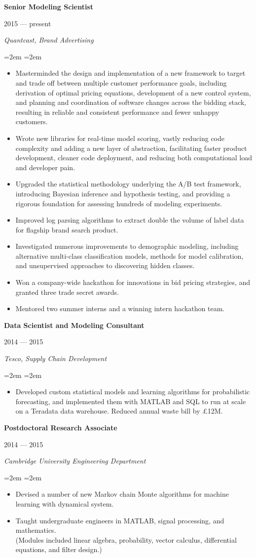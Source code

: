 \documentclass[letterpaper,10pt]{article}
\newcommand{\sepspace}{\vspace*{0.3em}}
\newcommand{\MainHeading}[1]{\noindent\textbf{#1}}
\newcommand{\SubHeading}[1]{\noindent\textit{#1}}
\newcommand{\DateBox}[1]{\colorbox{light-gray}{\parbox{8em}{\hfill\color{White}#1}}}
\newcommand{\Details}[1]{\hangindent=2em\hangafter=0\small#1\normalsize\par}
\newcommand{\WorkEntry}[4]{%
                \MainHeading{#1} \hfill \DateBox{#2} \par
                \SubHeading{#3} \par
                \noindent \hangindent=2em \hangafter=0 \Details{#4} }
\begin{document}
\WorkEntry{Senior Modeling Scientist}{2015 --- present}{Quantcast, Brand Advertising}{
\begin{itemize}
 \item Masterminded the design and implementation of a new framework to target and trade off between multiple customer performance goals, including derivation of optimal pricing equations, development of a new control system, and planning and coordination of software changes across the bidding stack, resulting in reliable and consistent performance and fewer unhappy customers.
 \item Wrote new libraries for real-time model scoring, vastly reducing code complexity and adding a new layer of abstraction, facilitating faster product development, cleaner code deployment, and reducing both computational load and developer pain.
 \item Upgraded the statistical methodology underlying the A/B test framework, introducing Bayesian inference and hypothesis testing, and providing a rigorous foundation for assessing hundreds of modeling experiments.
 \item Improved log parsing algorithms to extract double the volume of label data for flagship brand search product.
 \item Investigated numerous improvements to demographic modeling, including alternative multi-class classification models, methods for model calibration, and unsupervised approaches to discovering hidden classes.
 \item Won a company-wide hackathon for innovations in bid pricing strategies, and granted three trade secret awards.
 \item Mentored two summer interns and a winning intern hackathon team.%
\end{itemize}
}
\sepspace

\WorkEntry{Data Scientist and Modeling Consultant}{2014 --- 2015}{Tesco, Supply Chain Development}{
\begin{itemize}
 \item Developed custom statistical models and learning algorithms for probabilistic forecasting, and implemented them with MATLAB and SQL to run at scale on a Teradata data warehouse. Reduced annual waste bill by \pounds12M.
\end{itemize}
}
\sepspace

\WorkEntry{Postdoctoral Research Associate}{2014 --- 2015}{Cambridge University Engineering Department}{
\begin{itemize}
 \item Devised a number of new Markov chain Monte algorithms for machine learning with dynamical system.
 \item Taught undergraduate engineers in MATLAB, signal processing, and mathematics. \\ (Modules included linear algebra, probability, vector calculus, differential equations, and filter design.)
\end{itemize}
}
\sepspace
\end{document}
